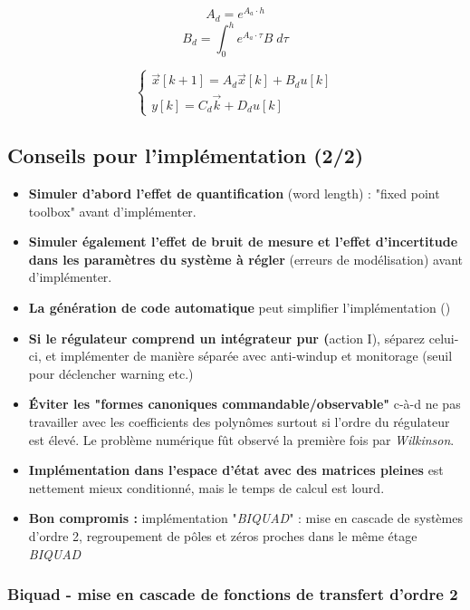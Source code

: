 \documentclass[document.tex]{subfiles}
\begin{document}

$$A_d = e^{A_a\cdot h}$$
$$B_d=\int_{0}^{h}e^{A_a \cdot \tau}B \; d\tau$$

$$
\begin{cases}
\vec{x}[k+1]=A_d\vec{x} [k]+B_d u[k] \\
y[k] = C_d \vec{k} + D_d u[k]
\end{cases} 
$$

\subsection{Conseils pour l'implémentation               (2/2)}
\begin{itemize}
\item \textbf{Simuler d'abord l'effet de quantification }(word length)  : "fixed point toolbox" avant d'implémenter.
\item \textbf{Simuler également l'effet de bruit de mesure et l'effet d'incertitude dans les paramètres du système à régler} (erreurs de modélisation) avant d'implémenter.
\item \textbf{La génération de code automatique} peut simplifier l'implémentation ()
\item \textbf{Si le régulateur comprend un intégrateur pur (}action I), séparez celui-ci, et implémenter de manière séparée avec anti-windup et monitorage (seuil pour déclencher warning etc.)
\item \textbf{Éviter les "formes canoniques commandable/observable"} c-à-d ne pas travailler avec les coefficients des polynômes surtout si l'ordre du régulateur est élevé. Le problème numérique fût observé la première fois par \textit{Wilkinson}.
\item \textbf{Implémentation dans l'espace d'état avec des matrices pleines} est nettement mieux conditionné, mais le temps de calcul est lourd.
\item \textbf{Bon compromis :} implémentation "\textit{BIQUAD}" : mise en cascade de systèmes d'ordre 2, regroupement de pôles et zéros proches dans le même étage \textit{BIQUAD}
\end{itemize}

\subsubsection{Biquad - mise en cascade de fonctions de transfert  d'ordre 2 }

\end{document}
